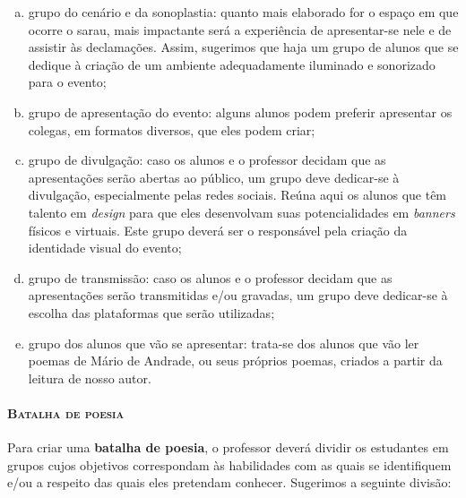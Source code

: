 \documentclass[11pt]{extarticle}
\begin{document}
\begin{enumerate}[(a)]

\item grupo do cenário e da sonoplastia: quanto mais elaborado for o espaço
em que ocorre o sarau, mais impactante será a experiência de
apresentar-se nele e de assistir às declamações. Assim, sugerimos que
haja um grupo de alunos que se dedique à criação de um ambiente
adequadamente iluminado e sonorizado para o evento;

\item grupo de apresentação do evento: alguns alunos podem preferir
apresentar os colegas, em formatos diversos, que eles podem criar;

\item grupo de divulgação: caso os alunos e o professor decidam que as
apresentações serão abertas ao público, um grupo deve dedicar-se à
divulgação, especialmente pelas redes sociais. Reúna aqui os alunos que
têm talento em \emph{design} para que eles desenvolvam suas
potencialidades em \emph{banners} físicos e virtuais. Este grupo deverá
ser o responsável pela criação da identidade visual do evento;

\item grupo de transmissão: caso os alunos e o professor decidam que as
apresentações serão transmitidas e/ou gravadas, um grupo deve dedicar-se
à escolha das plataformas que serão utilizadas;

\item grupo dos alunos que vão se apresentar: trata-se dos alunos que vão
ler poemas de Mário de Andrade, ou seus próprios poemas, criados a
partir da leitura de nosso autor.

\end{enumerate}


\paragraph{\textsc{Batalha de poesia}}

Para criar uma \textbf{batalha de poesia}, o professor deverá dividir os
estudantes em grupos cujos objetivos correspondam às habilidades com as
quais se identifiquem e/ou a respeito das quais eles pretendam conhecer.
Sugerimos a seguinte divisão:
\end{document}
